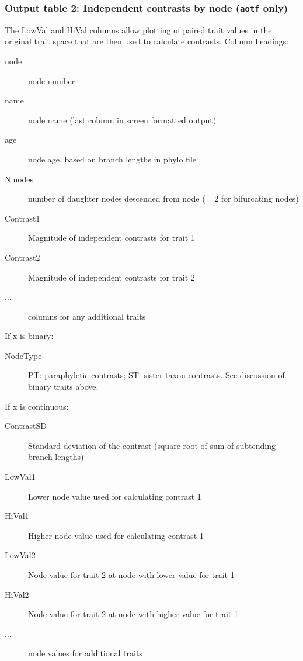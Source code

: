 \documentclass[12pt,letterpaper]{article}
\begin{document}
\subsubsection{Output table 2: Independent contrasts by node (\texttt{aotf} only)}

The LowVal and HiVal columns allow plotting of paired trait values in
the original trait space that are then used to calculate
contrasts. Column headings:

\begin{description}

\item[\hspace{1em} node] node number
\item[\hspace{1em} name] node name (last column in screen formatted output)
\item[\hspace{1em} age] node age, based on branch lengths in phylo file
\item[\hspace{1em} N.nodes] number of daughter nodes descended from
  node (= 2 for bifurcating nodes)
\item[\hspace{1em} Contrast1] Magnitude of independent contrasts for
  trait 1
\item[\hspace{1em} Contrast2] Magnitude of independent contrasts for trait 2
\item[\hspace{1em} ...] columns for any additional traits
\end{description}

\noindent If x is binary:

\begin{description}
\item[\hspace{1em} NodeType] PT: paraphyletic contrasts; ST: sister-taxon contrasts. See discussion of binary traits above.
\end{description}

\noindent If x is continuous:

\begin{description}
\item[\hspace{1em} ContrastSD] Standard deviation of the contrast (square root of sum of subtending branch lengths)
\item[\hspace{1em} LowVal1] Lower node value used for calculating contrast 1
\item[\hspace{1em} HiVal1] Higher node value used for calculating contrast 1
\item[\hspace{1em} LowVal2] Node value for trait 2 at node with lower value for trait 1
\item[\hspace{1em} HiVal2] Node value for trait 2 at node with higher value for trait 1
\item[\hspace{1em} ...] 	node values for additional traits
\end{description}
\end{document}
